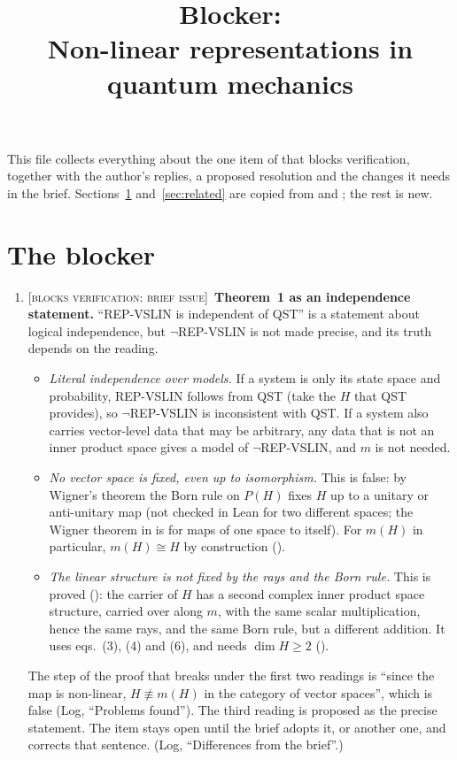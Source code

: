 \documentclass[11pt]{article}
\title{Blocker:\\ Non-linear representations in quantum mechanics}
\author{}
\date{}
\newcommand{\blocker}[1]{\textsc{[blocks verification: #1]}~}
\begin{document}
\maketitle

\noindent
This file collects everything about the one item of  that blocks
verification, together with the author's replies, a proposed resolution and the changes it needs
in the brief. Sections~\ref{sec:blocker} and~\ref{sec:related} are copied from
 and ; the rest is new.

\section{The blocker}\label{sec:blocker}
\begin{enumerate}
\item \blocker{brief issue}\textbf{Theorem~1 as an independence statement.}
  ``REP-VSLIN is independent of QST'' is a statement about logical independence, but
  $\neg$REP-VSLIN is not made precise, and its truth depends on the reading.
  \begin{itemize}
  \item \emph{Literal independence over models.} If a system is only its state space and
    probability, REP-VSLIN follows from QST (take the $H$ that QST provides), so
    $\neg$REP-VSLIN is inconsistent with QST. If a system also carries vector-level data that
    may be arbitrary, any data that is not an inner product space gives a model of
    $\neg$REP-VSLIN, and $m$ is not needed.
  \item \emph{No vector space is fixed, even up to isomorphism.} This is false: by Wigner's
    theorem the Born rule on $P(H)$ fixes $H$ up to a unitary or anti-unitary map (not checked
    in Lean for two different spaces; the Wigner theorem in  is for maps of
    one space to itself). For $m(H)$ in particular, $m(H) \cong H$ by construction
    ().
  \item \emph{The linear structure is not fixed by the rays and the Born rule.} This is
    proved (): the carrier of $H$ has a second complex
    inner product space structure, carried over along $m$, with the same scalar
    multiplication, hence the same rays, and the same Born rule, but a different addition. It
    uses eqs.~(3), (4) and (6), and needs $\dim H \ge 2$ ().
  \end{itemize}
  The step of the proof that breaks under the first two readings is ``since the map is
  non-linear, $H \not\equiv m(H)$ in the category of vector spaces'', which is false (Log,
  ``Problems found''). The third reading is proposed as the precise statement. The item stays
  open until the brief adopts it, or another one, and corrects that sentence. (Log,
  ``Differences from the brief''.)
\end{enumerate}
\end{document}
